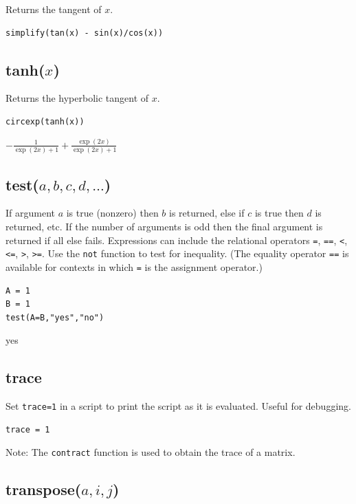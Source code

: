 \documentclass[12pt]{article}
\begin{document}
Returns the tangent of $x$.

{\color{blue}
\begin{verbatim}
simplify(tan(x) - sin(x)/cos(x))
\end{verbatim}
}


\subsection*{tanh($x$)}

Returns the hyperbolic tangent of $x$.

{\color{blue}
\begin{verbatim}
circexp(tanh(x))
\end{verbatim}
}

\noindent
$\displaystyle -\frac{1}{\exp(2x)+1}+\frac{\exp(2x)}{\exp(2x)+1}$

\subsection*{test($a,b,c,d,\ldots$)}

If argument $a$ is true (nonzero) then $b$ is returned, else if $c$ is true then $d$ is returned, etc.
If the number of arguments is odd then the final argument is returned if all else fails.
Expressions can include the relational operators
\verb$=$,
\verb$==$,
\verb$<$,
\verb$<=$,
\verb$>$,
\verb$>=$.
Use the
\verb$not$
function to test for inequality.
(The equality operator
\verb$==$
is available for contexts in which
\verb$=$
is the assignment operator.)

{\color{blue}
\begin{verbatim}
A = 1
B = 1
test(A=B,"yes","no")
\end{verbatim}
}

\noindent
yes

\subsection*{trace}

Set {\tt trace=1} in a script to print the script as it is evaluated.
Useful for debugging.

{\color{blue}
\begin{verbatim}
trace = 1
\end{verbatim}
}

\noindent
Note:
The
\verb$contract$
function is used to obtain the trace of a matrix.

\subsection*{transpose($a,i,j$)}
\end{document}
